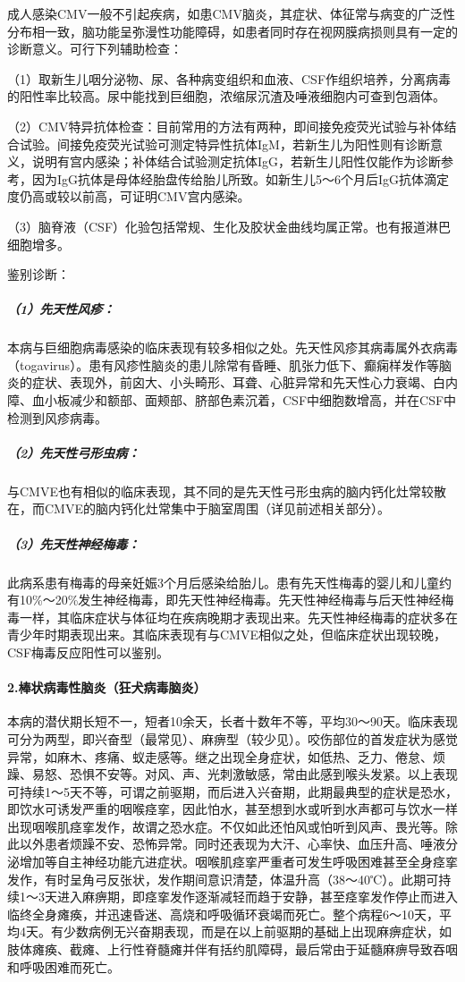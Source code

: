 成人感染CMV一般不引起疾病，如患CMV脑炎，其症状、体征常与病变的广泛性分布相一致，脑功能呈弥漫性功能障碍，如患者同时存在视网膜病损则具有一定的诊断意义。可行下列辅助检查：

（1）取新生儿咽分泌物、尿、各种病变组织和血液、CSF作组织培养，分离病毒的阳性率比较高。尿中能找到巨细胞，浓缩尿沉渣及唾液细胞内可查到包涵体。

（2）CMV特异抗体检查：目前常用的方法有两种，即间接免疫荧光试验与补体结合试验。间接免疫荧光试验可测定特异性抗体IgM，若新生儿为阳性则有诊断意义，说明有宫内感染；补体结合试验测定抗体IgG，若新生儿阳性仅能作为诊断参考，因为IgG抗体是母体经胎盘传给胎儿所致。如新生儿5～6个月后IgG抗体滴定度仍高或较以前高，可证明CMV宫内感染。

（3）脑脊液（CSF）化验包括常规、生化及胶状金曲线均属正常。也有报道淋巴细胞增多。

鉴别诊断：

\subparagraph{（1）先天性风疹：}

本病与巨细胞病毒感染的临床表现有较多相似之处。先天性风疹其病毒属外衣病毒（togavirus）。患有风疹性脑炎的患儿除常有昏睡、肌张力低下、癫痫样发作等脑炎的症状、表现外，前囟大、小头畸形、耳聋、心脏异常和先天性心力衰竭、白内障、血小板减少和额部、面颊部、脐部色素沉着，CSF中细胞数增高，并在CSF中检测到风疹病毒。

\subparagraph{（2）先天性弓形虫病：}

与CMVE也有相似的临床表现，其不同的是先天性弓形虫病的脑内钙化灶常较散在，而CMVE的脑内钙化灶常集中于脑室周围（详见前述相关部分）。

\subparagraph{（3）先天性神经梅毒：}

此病系患有梅毒的母亲妊娠3个月后感染给胎儿。患有先天性梅毒的婴儿和儿童约有10\%～20\%发生神经梅毒，即先天性神经梅毒。先天性神经梅毒与后天性神经梅毒一样，其临床症状与体征均在疾病晚期才表现出来。先天性神经梅毒的症状多在青少年时期表现出来。其临床表现有与CMVE相似之处，但临床症状出现较晚，CSF梅毒反应阳性可以鉴别。

\paragraph{2.棒状病毒性脑炎（狂犬病毒脑炎）}

本病的潜伏期长短不一，短者10余天，长者十数年不等，平均30～90天。临床表现可分为两型，即兴奋型（最常见）、麻痹型（较少见）。咬伤部位的首发症状为感觉异常，如麻木、疼痛、蚁走感等。继之出现全身症状，如低热、乏力、倦怠、烦躁、易怒、恐惧不安等。对风、声、光刺激敏感，常由此感到喉头发紧。以上表现可持续1～5天不等，可谓之前驱期，而后进入兴奋期，此期最典型的症状是恐水，即饮水可诱发严重的咽喉痉挛，因此怕水，甚至想到水或听到水声都可与饮水一样出现咽喉肌痉挛发作，故谓之恐水症。不仅如此还怕风或怕听到风声、畏光等。除此以外患者烦躁不安、恐怖异常。同时还表现为大汗、心率快、血压升高、唾液分泌增加等自主神经功能亢进症状。咽喉肌痉挛严重者可发生呼吸困难甚至全身痉挛发作，有时呈角弓反张状，发作期间意识清楚，体温升高（38～40℃）。此期可持续1～3天进入麻痹期，即痉挛发作逐渐减轻而趋于安静，甚至痉挛发作停止而进入临终全身瘫痪，并迅速昏迷、高烧和呼吸循环衰竭而死亡。整个病程6～10天，平均4天。有少数病例无兴奋期表现，而是在以上前驱期的基础上出现麻痹症状，如肢体瘫痪、截瘫、上行性脊髓瘫并伴有括约肌障碍，最后常由于延髓麻痹导致吞咽和呼吸困难而死亡。

